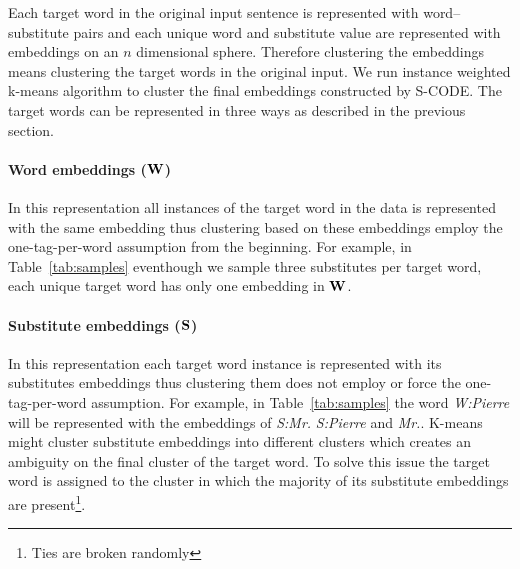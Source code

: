 Each target word in the original input sentence is represented with
word--substitute pairs and each unique word and substitute value are
represented with embeddings on an $n$ dimensional sphere.  Therefore
clustering the embeddings means clustering the target words in the
original input.  We run instance weighted k-means algorithm to cluster
the final embeddings constructed by S-CODE.  The target words can be
represented in three ways as described in the previous section.

\paragraph{Word embeddings (${\bf W}$)}  In this representation all
instances of the target word in the data is represented with the same
embedding thus clustering based on these embeddings employ the
one-tag-per-word assumption from the beginning.  For example, in
Table~\ref{tab:samples} eventhough we sample three substitutes per
target word, each unique target word has only one embedding in ${\bf
  W}$.

\paragraph{Substitute embeddings (${\bf S}$)}  In this representation 
each target word instance is represented with its substitutes
embeddings thus clustering them does not employ or force the
one-tag-per-word assumption.  For example, in Table~\ref{tab:samples}
the word \textit{W:Pierre} will be represented with the embeddings of
{\it S:Mr.} {\it S:Pierre} and {\it Mr.}.  K-means might cluster
substitute embeddings into different clusters which creates an
ambiguity on the final cluster of the target word.  To solve this
issue the target word is assigned to the cluster in which the majority
of its substitute embeddings are present\footnote{Ties are broken
  randomly}.

